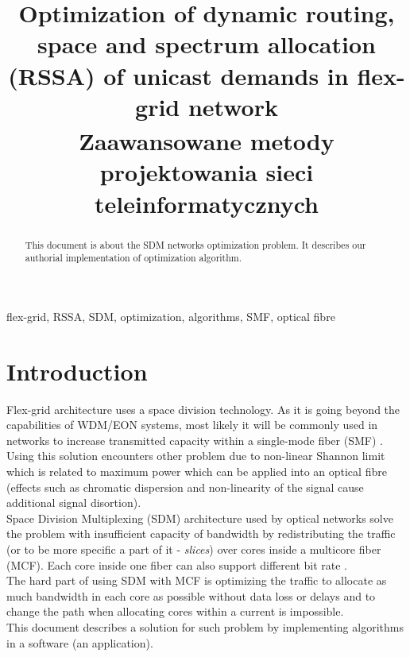 \documentclass[conference]{IEEEtran}
\begin{document}
\title{Optimization of dynamic routing, space and spectrum allocation
(RSSA) of unicast demands in flex-grid network\\
{\footnotesize \textsuperscript{} Zaawansowane metody projektowania sieci teleinformatycznych}
}

\author{
\and
{}
}

\maketitle

\begin{abstract}
This document is about the SDM networks optimization problem. It describes our authorial implementation of optimization algorithm. 
\end{abstract}

\begin{IEEEkeywords}
flex-grid, RSSA, SDM, optimization, algorithms, SMF, optical fibre
\end{IEEEkeywords}

\section{Introduction}
Flex-grid architecture uses a space division technology. As it is going beyond the capabilities of WDM/EON systems, most likely it will be commonly used in networks to increase transmitted capacity within a single-mode fiber (SMF) \cite{sdm-walko}. Using this solution encounters other problem due to non-linear Shannon limit which is related to maximum power which can be applied into an optical fibre (effects such as chromatic dispersion and non-linearity of the signal cause additional signal disortion)\cite{shannon}.
\\
Space Division Multiplexing (SDM) architecture used by optical networks solve the problem with insufficient capacity of bandwidth by redistributing the traffic (or to be more specific a part of it - \textit{slices}) over cores inside a multicore fiber (MCF). Each core inside one fiber can also support different bit rate \cite{flex-intro}.
\\
The hard part of using SDM with MCF is optimizing the traffic to allocate as much bandwidth in each core as possible without data loss or delays and to change the path when allocating cores within a current is impossible.
\\
This document describes a solution for such problem by implementing algorithms in a software (an application).
\\
\end{document}
